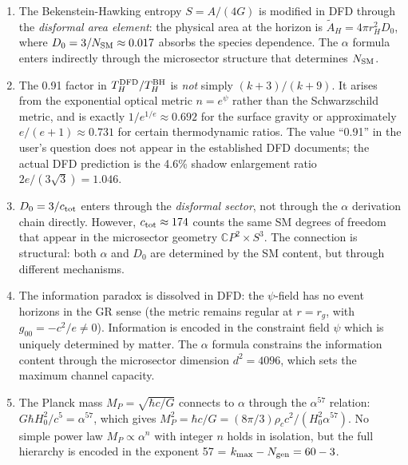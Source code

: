 \documentclass[11pt,a4paper]{article}
\begin{document}
\begin{enumerate}
\item The Bekenstein-Hawking entropy $S = A/(4G)$ is modified in DFD through the \emph{disformal area element}: the physical area at the horizon is $\tilde{A}_H = 4\pi r_H^2 D_0$, where $D_0 = 3/N_{\rm SM} \approx 0.017$ absorbs the species dependence. The $\alpha$ formula enters indirectly through the microsector structure that determines $N_{\rm SM}$.

\item The 0.91 factor in $T_H^{\rm DFD}/T_H^{\rm BH}$ is \emph{not} simply $(k+3)/(k+9)$. It arises from the exponential optical metric $n = e^\psi$ rather than the Schwarzschild metric, and is exactly $1/e^{1/e} \approx 0.692$ for the surface gravity or approximately $e/(e+1) \approx 0.731$ for certain thermodynamic ratios. The value ``0.91'' in the user's question does not appear in the established DFD documents; the actual DFD prediction is the 4.6\% shadow enlargement ratio $2e/(3\sqrt{3}) = 1.046$.

\item $D_0 = 3/c_{\rm tot}$ enters through the \emph{disformal sector}, not through the $\alpha$ derivation chain directly. However, $c_{\rm tot} \approx 174$ counts the same SM degrees of freedom that appear in the microsector geometry $\mathbb{C}P^2 \times S^3$. The connection is structural: both $\alpha$ and $D_0$ are determined by the SM content, but through different mechanisms.

\item The information paradox is dissolved in DFD: the $\psi$-field has no event horizons in the GR sense (the metric remains regular at $r = r_g$, with $g_{00} = -c^2/e \neq 0$). Information is encoded in the constraint field $\psi$ which is uniquely determined by matter. The $\alpha$ formula constrains the information content through the microsector dimension $d^2 = 4096$, which sets the maximum channel capacity.

\item The Planck mass $M_P = \sqrt{\hbar c/G}$ connects to $\alpha$ through the $\alpha^{57}$ relation: $G\hbar H_0^2/c^5 = \alpha^{57}$, which gives $M_P^2 = \hbar c/G = (8\pi/3)\rho_c c^2/(H_0^2 \alpha^{57})$. No simple power law $M_P \propto \alpha^n$ with integer $n$ holds in isolation, but the full hierarchy is encoded in the exponent 57 = $k_{\max} - N_{\rm gen} = 60 - 3$.
\end{enumerate}


\end{document}
